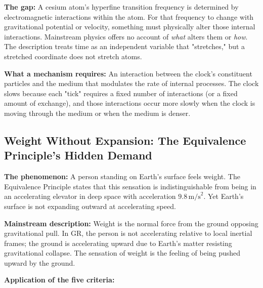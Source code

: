 \documentclass[12pt, a4paper]{article}
\begin{document}
\textbf{The gap:} A cesium atom's hyperfine transition frequency is determined by electromagnetic interactions within the atom. For that frequency to change with gravitational potential or velocity, something must physically alter those internal interactions. Mainstream physics offers no account of \textit{what} alters them or \textit{how}. The description treats time as an independent variable that "stretches," but a stretched coordinate does not stretch atoms.

\textbf{What a mechanism requires:} An interaction between the clock's constituent particles and the medium that modulates the rate of internal processes. The clock slows because each "tick" requires a fixed number of interactions (or a fixed amount of exchange), and those interactions occur more slowly when the clock is moving through the medium or when the medium is denser.

\subsection{Weight Without Expansion: The Equivalence Principle's Hidden Demand}
\label{subsec:weight_gap}

\textbf{The phenomenon:} A person standing on Earth's surface feels weight. The Equivalence Principle states that this sensation is indistinguishable from being in an accelerating elevator in deep space with acceleration \( 9.8 \, \text{m/s}^2 \). Yet Earth's surface is not expanding outward at accelerating speed.

\textbf{Mainstream description:} Weight is the normal force from the ground opposing gravitational pull. In GR, the person is not accelerating relative to local inertial frames; the ground is accelerating upward due to Earth's matter resisting gravitational collapse. The sensation of weight is the feeling of being pushed upward by the ground.

\textbf{Application of the five criteria:}
\end{document}
